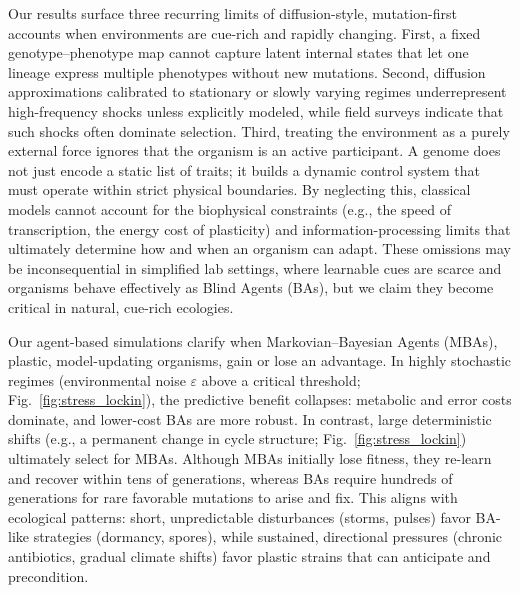 \documentclass[aps,pre,twocolumn,floatfix,nofootinbib,amsmath,amssymb]{revtex4-2}
\begin{document}
Our results surface three recurring limits of diffusion-style, mutation-first accounts when environments are cue-rich and rapidly changing. First, a fixed genotype–phenotype map cannot capture latent internal states that let one lineage express multiple phenotypes without new mutations. Second, diffusion approximations calibrated to stationary or slowly varying regimes underrepresent high-frequency shocks unless explicitly modeled, while field surveys indicate that such shocks often dominate selection. Third, treating the environment as a purely external force ignores that the organism is an active participant. A genome does not just encode a static list of traits; it builds a dynamic control system \citep{noble_its_2024} that must operate within strict physical boundaries. By neglecting this, classical models cannot account for the biophysical constraints (e.g., the speed of transcription, the energy cost of plasticity) and information-processing limits that ultimately determine how and when an organism can adapt. These omissions may be inconsequential in simplified lab settings, where learnable cues are scarce and organisms behave effectively as Blind Agents (BAs), but we claim they become critical in natural, cue-rich ecologies.

Our agent-based simulations clarify when Markovian–Bayesian Agents (MBAs), plastic, model-updating organisms, gain or lose an advantage. In highly stochastic regimes (environmental noise $\varepsilon$ above a critical threshold; Fig.~\ref{fig:stress_lockin}), the predictive benefit collapses: metabolic and error costs dominate, and lower-cost BAs are more robust. In contrast, large deterministic shifts (e.g., a permanent change in cycle structure; Fig.~\ref{fig:stress_lockin}) ultimately select for MBAs. Although MBAs initially lose fitness, they re-learn and recover within tens of generations, whereas BAs require hundreds of generations for rare favorable mutations to arise and fix. This aligns with ecological patterns: short, unpredictable disturbances (storms, pulses) favor BA-like strategies (dormancy, spores), while sustained, directional pressures (chronic antibiotics, gradual climate shifts) favor plastic strains that can anticipate and precondition.
\end{document}
